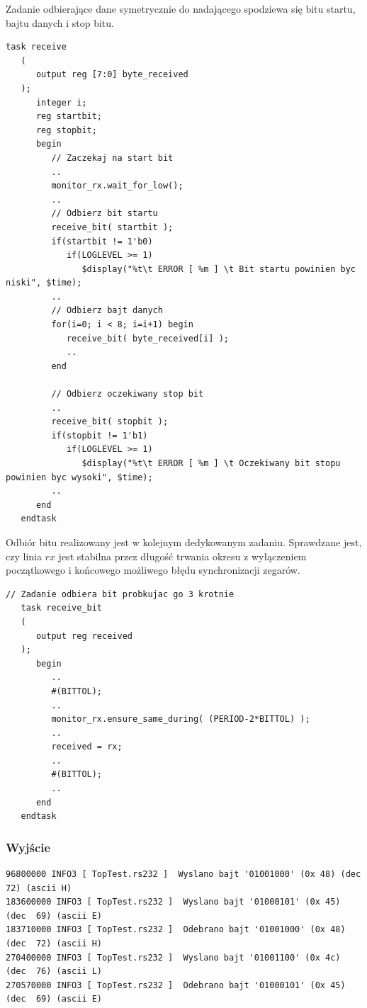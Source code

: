 \documentclass[a4paper,12pt]{article}
\begin{document}
Zadanie odbierające dane symetrycznie do nadającego spodziewa się bitu startu, bajtu danych i stop bitu.
\begin{lstlisting}[label=sim/Rs232 behav,caption=sim/Rs232 behav.v,firstnumber=118]
   task receive
   (
      output reg [7:0] byte_received
   );
      integer i;
      reg startbit;
      reg stopbit;
      begin
         // Zaczekaj na start bit
         ..
         monitor_rx.wait_for_low();
         ..
         // Odbierz bit startu
         receive_bit( startbit );
         if(startbit != 1'b0)
            if(LOGLEVEL >= 1)
               $display("%t\t ERROR [ %m ] \t Bit startu powinien byc niski", $time);
         ..
         // Odbierz bajt danych
         for(i=0; i < 8; i=i+1) begin
            receive_bit( byte_received[i] );
            ..
         end

         // Odbierz oczekiwany stop bit
         ..
         receive_bit( stopbit );
         if(stopbit != 1'b1)
            if(LOGLEVEL >= 1)
               $display("%t\t ERROR [ %m ] \t Oczekiwany bit stopu powinien byc wysoki", $time);
         ..
      end
   endtask
\end{lstlisting}

Odbiór bitu realizowany jest w kolejnym dedykowanym zadaniu. Sprawdzane jest, czy linia $rx$ jest stabilna przez długość trwania okresu z wyłączeniem początkowego i końcowego możliwego błędu synchronizacji zegarów.
\begin{lstlisting}[label=sim/Rs232 behav,caption=sim/Rs232 behav.v,firstnumber=89]
   // Zadanie odbiera bit probkujac go 3 krotnie
   task receive_bit
   (
      output reg received
   );
      begin
         ..
         #(BITTOL);
         ..
         monitor_rx.ensure_same_during( (PERIOD-2*BITTOL) );
         ..
         received = rx;
         ..
         #(BITTOL);
         ..
      end
   endtask
\end{lstlisting}


\subsubsection{Wyjście}

\begin{lstlisting}[label=rsout,caption=Rs log,firstnumber=255]
96800000 INFO3 [ TopTest.rs232 ]  Wyslano bajt '01001000' (0x 48) (dec  72) (ascii H)
183600000 INFO3 [ TopTest.rs232 ]  Wyslano bajt '01000101' (0x 45) (dec  69) (ascii E)
183710000 INFO3 [ TopTest.rs232 ]  Odebrano bajt '01001000' (0x 48) (dec  72) (ascii H)
270400000 INFO3 [ TopTest.rs232 ]  Wyslano bajt '01001100' (0x 4c) (dec  76) (ascii L)
270570000 INFO3 [ TopTest.rs232 ]  Odebrano bajt '01000101' (0x 45) (dec  69) (ascii E)
\end{lstlisting}
\end{document}
